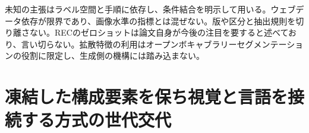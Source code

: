 \documentclass[lualatex,a4paper,10pt]{jlreq}
\begin{document}
\begin{claimboundary}[本節の読解上の境界]
\noindent 未知の主張はラベル空間と手順に依存し、条件結合を明示して用いる。ウェブデータ依存が限界であり、画像水準の指標とは混ぜない。版や区分と抽出規則を切り離さない。RECのゼロショットは論文自身が今後の注目を要すると述べており、言い切らない。拡散特徴の利用はオープンボキャブラリーセグメンテーションの役割に限定し、生成側の機構には踏み込まない。\autocite{vmd041,vmd042,vmd043,vmd044,vmd045,vmd046,vmd047,vmd048,vmd049,vmd050,vmd051,vmd052,vmd053,vmd056,vmd054,vmd055}\par
\end{claimboundary}

\Needspace{0.20\textheight}
\section{凍結した構成要素を保ち視覚と言語を接続する方式の世代交代}
\label{sec:p08}
\end{document}
